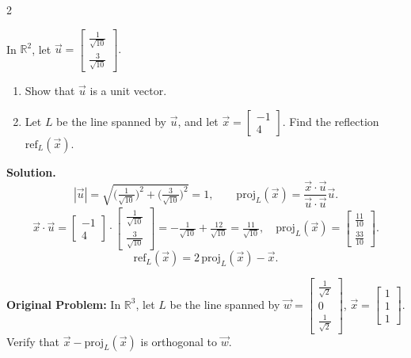 \documentclass[8pt]{extarticle}
\begin{document}
\begin{multicols}{2}
\begin{tcolorbox}[title=]
\noindent
In \(\mathbb{R}^{2}\), let
\(
\vec{u}=\begin{bmatrix}\tfrac{1}{\sqrt{10}}\\[4pt]\tfrac{3}{\sqrt{10}}\end{bmatrix}.
\)
\begin{enumerate}
\item[(a)] Show that \(\vec{u}\) is a unit vector.
\item[(b)] Let \(L\) be the line spanned by \(\vec{u}\), and let
\(
\vec{x}=\begin{bmatrix}-1\\4\end{bmatrix}.
\)
Find the reflection \(\mathrm{ref}_{L}(\vec{x})\).
\end{enumerate}

\textbf{Solution.}
\[
|\vec{u}|=\sqrt{\big(\tfrac1{\sqrt{10}}\big)^{2}+\big(\tfrac3{\sqrt{10}}\big)^{2}}=1,\qquad
\mathrm{proj}_{L}(\vec{x})=\frac{\vec{x}\cdot\vec{u}}{\vec{u}\cdot\vec{u}}\vec{u}.
\]
\[
\vec{x}\cdot\vec{u}
=\begin{bmatrix}-1\\4\end{bmatrix}\!\cdot\!
\begin{bmatrix}\tfrac1{\sqrt{10}}\\[2pt]\tfrac3{\sqrt{10}}\end{bmatrix}
=-\tfrac1{\sqrt{10}}+\tfrac{12}{\sqrt{10}}=\tfrac{11}{\sqrt{10}},
\quad
\mathrm{proj}_{L}(\vec{x})
=\begin{bmatrix}\tfrac{11}{10}\\[2pt]\tfrac{33}{10}\end{bmatrix}.
\]
\[
\mathrm{ref}_{L}(\vec{x})=2\,\mathrm{proj}_{L}(\vec{x})-\vec{x}.
\]
\end{tcolorbox}

\begin{tcolorbox}[title=]
\noindent
\textbf{Original Problem:}
In \(\mathbb{R}^{3}\), let \(L\) be the line spanned by
\(
\vec{w}=\begin{bmatrix}\tfrac1{\sqrt{2}}\\[2pt]0\\[2pt]\tfrac1{\sqrt{2}}\end{bmatrix}
\),
\(
\vec{x}=\begin{bmatrix}1\\1\\1\end{bmatrix}.
\)
Verify that \(\vec{x}-\mathrm{proj}_{L}(\vec{x})\) is orthogonal to \(\vec{w}\).


\end{tcolorbox}
\end{multicols}
\end{document}
